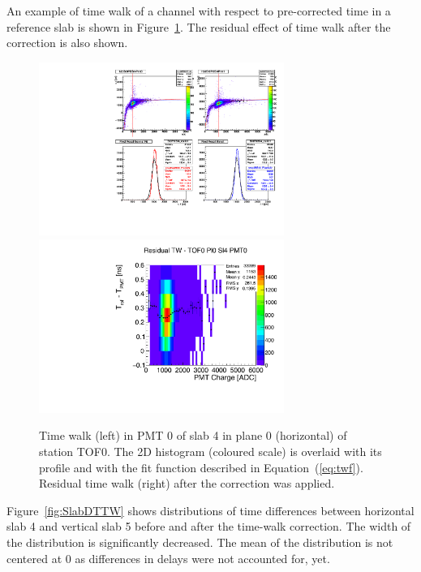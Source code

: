 An example of time walk of a channel with respect to pre-corrected
time in a reference slab is shown in Figure~\ref{fig:TW}. The residual
effect of time walk after the correction is also shown.

\begin{figure}
  \begin{center}
  \includegraphics[clip,trim=0 8.5cm 10cm 0, width=8cm]{01_tw_example}
  \includegraphics[width=8cm]{03_residual_tw_example} \\
  \caption{Time walk (left) in PMT 0 of slab 4 in plane 0 (horizontal)
    of station TOF0. The 2D histogram (coloured scale) is overlaid
    with its profile and with the fit function described in
    Equation~(\ref{eq:twf}).  Residual time walk (right) after the
    correction was applied.  }
  \label{fig:TW}
  \end{center}
\end{figure}



Figure~\ref{fig:SlabDTTW} shows distributions of time differences
between horizontal slab 4 and vertical slab 5 before and after the
time-walk correction. The width of the distribution is significantly
decreased. The mean of the distribution is not centered at 0 as
differences in delays \Tzero{} were not accounted for, yet.

